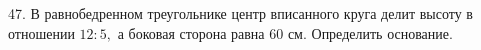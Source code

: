 47. В равнобедренном треугольнике центр вписанного круга делит высоту в отношении $12:5,$ а боковая сторона равна 60 см. Определить основание.\\
